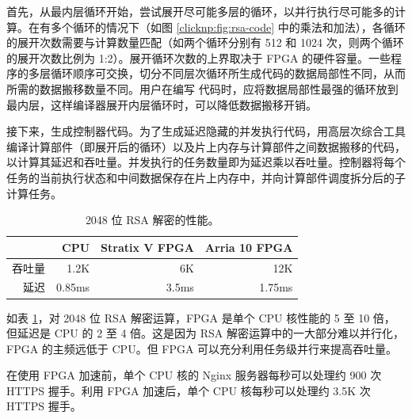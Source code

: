 首先，\name 从最内层循环开始，尝试展开尽可能多层的循环，以并行执行尽可能多的计算。在有多个循环的情况下（如图 \ref{clicknp:fig:rsa-code} 中的乘法和加法），各循环的展开次数需要与计算数量匹配（如两个循环分别有 512 和 1024 次，则两个循环的展开次数比例为 1:2）。展开循环次数的上界取决于 FPGA 的硬件容量。一些程序的多层循环顺序可交换，切分不同层次循环所生成代码的数据局部性不同，从而所需的数据搬移数量不同。用户在编写 \name 代码时，应将数据局部性最强的循环放到最内层，这样编译器展开内层循环时，可以降低数据搬移开销。

接下来，\name 生成控制器代码。为了生成延迟隐藏的并发执行代码，\name 用高层次综合工具编译计算部件（即展开后的循环）以及片上内存与计算部件之间数据搬移的代码，以计算其延迟和吞吐量。并发执行的任务数量即为延迟乘以吞吐量。控制器将每个任务的当前执行状态和中间数据保存在片上内存中，并向计算部件调度拆分后的子计算任务。


\begin{table}[htbp]
	\centering
	\caption{2048 位 RSA 解密的性能。}
	\label{clicknp:tab:https-rsa}
	\small
	\begin{tabular}{r|r|r|r}
		\toprule
		 & CPU & Stratix V FPGA & Arria 10 FPGA \\
		\midrule
吞吐量 & 1.2K & 6K & 12K \\
延迟 & 0.85ms & 3.5ms & 1.75ms \\
		\bottomrule
	\end{tabular}
\end{table}

如表 \ref{clicknp:tab:https-rsa}，对 2048 位 RSA 解密运算，FPGA 是单个 CPU 核性能的 5 至 10 倍，但延迟是 CPU 的 2 至 4 倍。这是因为 RSA 解密运算中的一大部分难以并行化，FPGA 的主频远低于 CPU。但 FPGA 可以充分利用任务级并行来提高吞吐量。

在使用 FPGA 加速前，单个 CPU 核的 Nginx 服务器每秒可以处理约 900 次 HTTPS 握手。利用 FPGA 加速后，单个 CPU 核每秒可以处理约 3.5K 次 HTTPS 握手。


